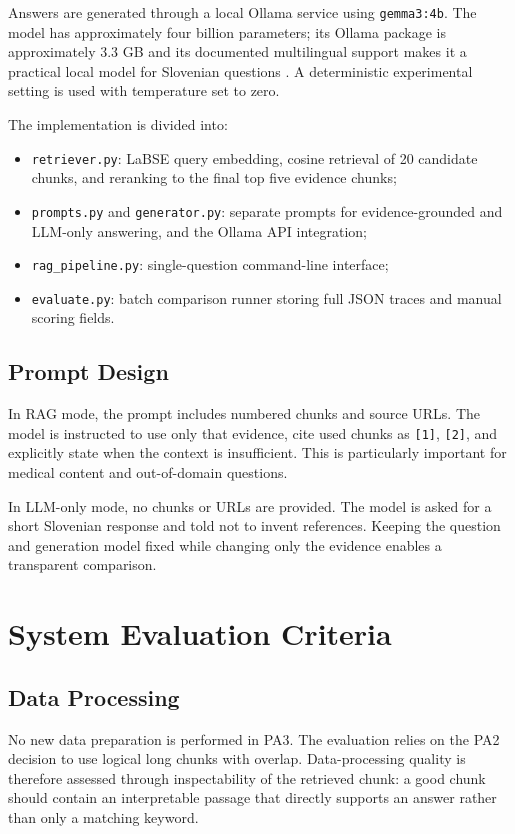\documentclass[9pt]{IEEEtran}
\begin{document}
Answers are generated through a local Ollama service using
\texttt{gemma3:4b}.  The model has approximately four billion parameters; its
Ollama package is approximately 3.3 GB and its documented multilingual
support makes it a practical local model for Slovenian questions
\cite{ollamagemma}.  A deterministic experimental setting is used with
temperature set to zero.

The implementation is divided into:
\begin{itemize}
    \item \texttt{retriever.py}: LaBSE query embedding, cosine retrieval of 20
    candidate chunks, and reranking to the final top five evidence chunks;
    \item \texttt{prompts.py} and \texttt{generator.py}: separate prompts for
    evidence-grounded and LLM-only answering, and the Ollama API integration;
    \item \texttt{rag\_pipeline.py}: single-question command-line interface;
    \item \texttt{evaluate.py}: batch comparison runner storing full JSON
    traces and manual scoring fields.
\end{itemize}

\subsection{Prompt Design}
In RAG mode, the prompt includes numbered chunks and source URLs.  The model
is instructed to use only that evidence, cite used chunks as \texttt{[1]},
\texttt{[2]}, and explicitly state when the context is insufficient.  This is
particularly important for medical content and out-of-domain questions.

In LLM-only mode, no chunks or URLs are provided.  The model is asked for a
short Slovenian response and told not to invent references.  Keeping the
question and generation model fixed while changing only the evidence enables
a transparent comparison.

\section{System Evaluation Criteria}

\subsection{Data Processing}
No new data preparation is performed in PA3.  The evaluation relies on the
PA2 decision to use logical long chunks with overlap.  Data-processing quality
is therefore assessed through inspectability of the retrieved chunk: a good
chunk should contain an interpretable passage that directly supports an
answer rather than only a matching keyword.
\end{document}
